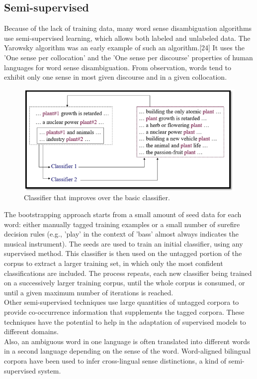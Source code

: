 \subsection*{Semi-supervised}
Because of the lack of training data, many word sense disambiguation algorithms use semi-supervised learning, which allows both labeled and unlabeled data. The Yarowsky algorithm was an early example of such an algorithm.[24] It uses the 'One sense per collocation' and the 'One sense per discourse' properties of human languages for word sense disambiguation. From observation, words tend to exhibit only one sense in most given discourse and in a given collocation.\\
\begin{figure}[tbh]
	\begin{center}
		\includegraphics[width=\columnwidth]{union(semi)}
	\end{center}
	\caption{Classifier that improves over the basic classifier. \label{fig}}
\end{figure}
The bootstrapping approach starts from a small amount of seed data for each word: either manually tagged training examples or a small number of surefire decision rules (e.g., 'play' in the context of 'bass' almost always indicates the musical instrument). The seeds are used to train an initial classifier, using any supervised method. This classifier is then used on the untagged portion of the corpus to extract a larger training set, in which only the most confident classifications are included. The process repeats, each new classifier being trained on a successively larger training corpus, until the whole corpus is consumed, or until a given maximum number of iterations is reached.\\
Other semi-supervised techniques use large quantities of untagged corpora to provide co-occurrence information that supplements the tagged corpora. These techniques have the potential to help in the adaptation of supervised models to different domains.\\
Also, an ambiguous word in one language is often translated into different words in a second language depending on the sense of the word. Word-aligned bilingual corpora have been used to infer cross-lingual sense distinctions, a kind of semi-supervised system.
